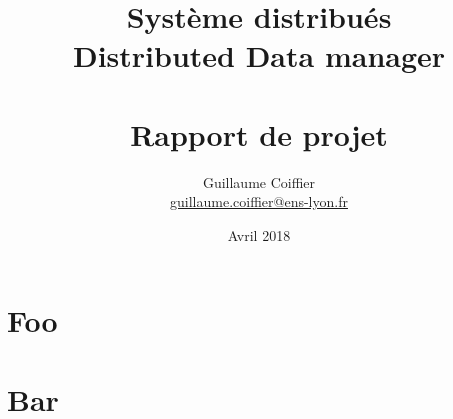 \documentclass[a4paper]{report}
\title{\Huge\bfseries Système distribués \\ Distributed Data manager \\~\\ \Large Rapport de projet}
\author{Guillaume Coiffier \\ \href{mailto:guillaume.coiffier@ens-lyon.fr}{guillaume.coiffier@ens-lyon.fr}}
\date{Avril 2018}
\begin{document}
\maketitle
\tableofcontents

\chapter{Foo}
\chapter{Bar}
\end{document}
